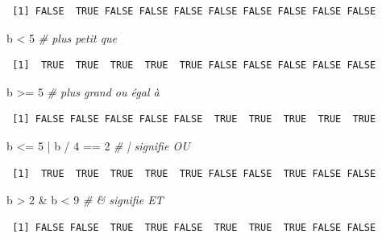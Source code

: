 \documentclass[
  12pt,
]{book}
\newenvironment{Shaded}{\begin{snugshade}}{\end{snugshade}}
\newcommand{\CommentTok}[1]{\textcolor[rgb]{0.56,0.35,0.01}{\textit{#1}}}
\newcommand{\DecValTok}[1]{\textcolor[rgb]{0.00,0.00,0.81}{#1}}
\newcommand{\NormalTok}[1]{#1}
\newcommand{\SpecialCharTok}[1]{\textcolor[rgb]{0.00,0.00,0.00}{#1}}
\begin{document}
\begin{verbatim}
 [1] FALSE  TRUE FALSE FALSE FALSE FALSE FALSE FALSE FALSE FALSE
\end{verbatim}

\begin{Shaded}
\begin{Highlighting}[]
\NormalTok{b }\SpecialCharTok{\textless{}} \DecValTok{5} \CommentTok{\# plus petit que}
\end{Highlighting}
\end{Shaded}

\begin{verbatim}
 [1]  TRUE  TRUE  TRUE  TRUE  TRUE FALSE FALSE FALSE FALSE FALSE
\end{verbatim}

\begin{Shaded}
\begin{Highlighting}[]
\NormalTok{b }\SpecialCharTok{\textgreater{}=} \DecValTok{5} \CommentTok{\# plus grand ou égal à}
\end{Highlighting}
\end{Shaded}

\begin{verbatim}
 [1] FALSE FALSE FALSE FALSE FALSE  TRUE  TRUE  TRUE  TRUE  TRUE
\end{verbatim}

\begin{Shaded}
\begin{Highlighting}[]
\NormalTok{b }\SpecialCharTok{\textless{}=} \DecValTok{5} \SpecialCharTok{|}\NormalTok{ b }\SpecialCharTok{/} \DecValTok{4} \SpecialCharTok{==} \DecValTok{2} \CommentTok{\# | signifie OU}
\end{Highlighting}
\end{Shaded}

\begin{verbatim}
 [1]  TRUE  TRUE  TRUE  TRUE  TRUE FALSE FALSE  TRUE FALSE FALSE
\end{verbatim}

\begin{Shaded}
\begin{Highlighting}[]
\NormalTok{b }\SpecialCharTok{\textgreater{}} \DecValTok{2} \SpecialCharTok{\&}\NormalTok{ b }\SpecialCharTok{\textless{}} \DecValTok{9} \CommentTok{\# \& signifie ET}
\end{Highlighting}
\end{Shaded}

\begin{verbatim}
 [1] FALSE FALSE  TRUE  TRUE FALSE  TRUE  TRUE  TRUE FALSE FALSE
\end{verbatim}
\end{document}
